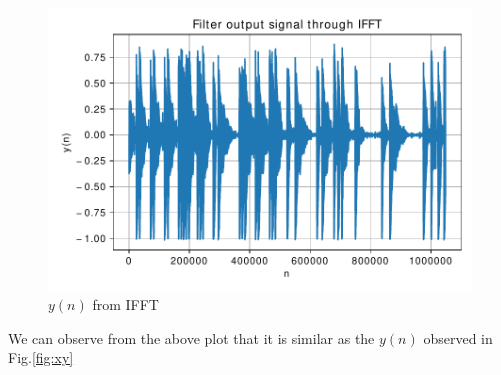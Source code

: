 \documentclass[journal,12pt,twocolumn]{IEEEtran}
\renewcommand\thesection{\arabic{section}}
\begin{document}
\begin{enumerate}[label=\thesection.\arabic*
,ref=\thesection.\theenumi]
\begin{lstlisting}
\end{lstlisting}
\begin{figure}[!ht]
\centering
\includegraphics[width=\columnwidth]{./figs/ifft}
\caption{$y(n)$ from IFFT}
\label{fig:ifft}
\end{figure}
We can observe from the above plot that it is similar as the $y(n)$ observed in Fig.\ref{fig:xy}
\end{enumerate}
\end{document}

